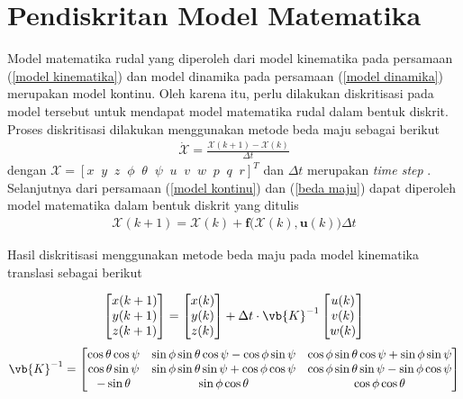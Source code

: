 \section{Pendiskritan Model Matematika}
Model matematika rudal yang diperoleh dari model kinematika pada persamaan (\ref{model kinematika}) dan model dinamika pada persamaan (\ref{model dinamika}) merupakan model kontinu. Oleh karena itu, perlu dilakukan diskritisasi pada model tersebut untuk mendapat model matematika rudal dalam bentuk diskrit. Proses diskritisasi dilakukan menggunakan metode beda maju sebagai berikut
\begin{align}
    \dot{\pmb{\mathcal{X}}} = \frac{\pmb{\mathcal{X}}(k+1)-\pmb{\mathcal{X}}(k)}{\Delta t} \label{beda maju}
\end{align}
dengan $\pmb{\mathcal{X}}=[x\;\;y\;\;z\;\;\phi\;\;\theta\;\;\psi\;\;u\;\;v\;\;w\;\;p\;\;q\;\;r]^T$ dan $\Delta t$ merupakan \textit{time step} . Selanjutnya dari persamaan (\ref{model kontinu}) dan (\ref{beda maju}) dapat diperoleh model matematika dalam bentuk diskrit yang ditulis
\begin{align}
    \pmb{\mathcal{X}}(k+1) = \pmb{\mathcal{X}}(k)+\pmb{f}\bigl(\pmb{\mathcal{X}}(k),\pmb{u}(k)\bigr)\Delta t
\end{align}

Hasil diskritisasi menggunakan metode beda maju pada model kinematika translasi sebagai berikut

\begin{align}
    \begin{bmatrix}
        x(k+1) \\
        y(k+1) \\
        z(k+1)
    \end{bmatrix} = \begin{bmatrix}
        x(k) \\
        y(k) \\
        z(k)
    \end{bmatrix} + \Delta t \cdot \vb{K}^{-1}  
    \begin{bmatrix}
        u(k) \\ v(k) \\ w(k)
    \end{bmatrix}
\end{align}
\begin{align*}
\vb{K}^{-1} = \begin{bmatrix}
        \cos\theta\cos\psi & \sin\phi\sin\theta\cos\psi-\cos\phi\sin\psi & \cos\phi\sin\theta\cos\psi+\sin\phi\sin\psi \\
        \cos\theta\sin\psi & \sin\phi\sin\theta\sin\psi+\cos\phi\cos\psi & \cos\phi\sin\theta\sin\psi-\sin\phi\cos\psi \\
        -\sin\theta & \sin\phi\cos\theta & \cos\phi\cos\theta 
    \end{bmatrix}
\end{align*}

